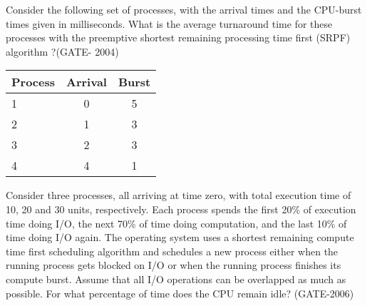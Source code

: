 

\begin{questyle}

  \question  Consider the following set of processes, with the arrival times and the CPU-burst times given in milliseconds.
            What is the average turnaround time for these processes with the preemptive shortest remaining processing
            time first (SRPF) algorithm ?(GATE- 2004)

  \begin{myTableStyle}
    \begin{center}
    \begin{tabular}{ |l|c|c| } \hline
        Process &   Arrival & Burst    \\ \hline
        1      &   0       & 5         \\ \hline
        2      &   1       & 3         \\ \hline
        3      &   2       & 3         \\ \hline
        4      &   4       & 1         \\ \hline
    \end{tabular}
    \end{center}
  \end{myTableStyle}
  \vspace{0.08in}

  \begin{oneparchoices}
  \end{oneparchoices}

  \end{questyle}




\begin{questyle}

  \question  Consider three processes, all arriving at time zero, with total execution time of 10, 20 and 30 units,
            respectively. Each process spends the first 20\% of execution time doing I/O, the next 70\% of time doing
            computation, and the last 10\% of time doing I/O again. The operating system uses a shortest remaining
            compute time first scheduling algorithm and schedules a new process either when the running process
            gets blocked on I/O or when the running process finishes its compute burst. Assume that all I/O operations
            can be overlapped as much as possible. For what percentage of time does the CPU remain idle? (GATE-2006)

  \begin{oneparchoices}
  \end{oneparchoices}

  \end{questyle}

